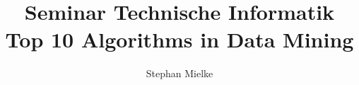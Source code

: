 \documentclass[12pt,journal,compsoc]{IEEEtran}
\begin{document}
%
\title{Seminar Technische Informatik\\ Top 10 Algorithms in Data Mining}
%
%
%
%

\author{Stephan Mielke}

% 
%
\end{document}
